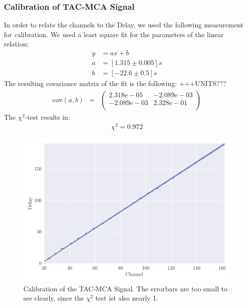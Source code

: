 \subsubsection{Calibration of TAC-MCA Signal}
\label{subs:calib_TAC}
In order to relate the channels to the Delay, we used the following
measurement for calibration. We used a least square fit for the parameters
of the linear relation:
\begin{align}
    \label{eq:coeff}
    y &= ax + b \\
    a &= \left[ 1.315 \pm 0.005 \right]s\\
    b &= \left[ -22.6 \pm 0.5 \right]s 
\end{align}
The resulting covariance matrix of the fit is the following:
+++UNITS???
\begin{align}
    \label{eq:cov}
    \mathrm{cov}(a, b) &=& 
    \begin{pmatrix}
        2.318\mathrm{e}-05 &-2.089\mathrm{e}-03 \\
        -2.089\mathrm{e}-03 &2.328\mathrm{e}-01 \\
    \end{pmatrix}
\end{align}
The $\chi^2$-test results in:
\begin{align}
    \label{eq:}
   \chi^2 = 0.972
\end{align}

\label{sub:calibration_of_tac_mca_signal}
\begin{figure}[htpb]
    \centering
    \includegraphics[width=1.0\linewidth]{analysis/figures/plot7}
    \caption{Calibration of the TAC-MCA Signal. The errorbars are too small
        to see clearly, since the $\chi^2$ test ist also nearly 1.}
    \label{fig:plot7}
\end{figure}



